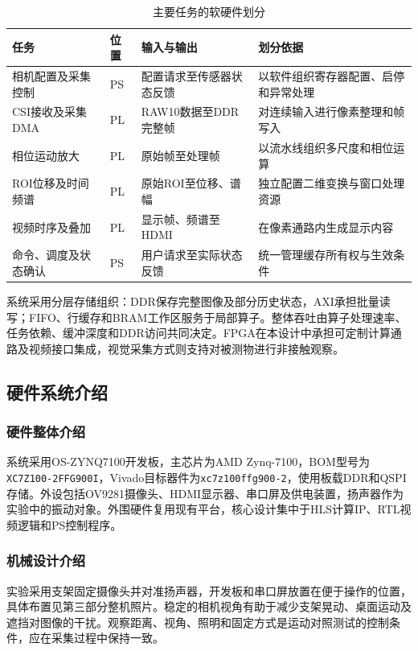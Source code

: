 \documentclass[UTF8,a4paper,zihao=-4,fontset=none]{ctexart}
\renewcommand{\small}{\fontsize{10.5pt}{13pt}\selectfont}
\numberwithin{figure}{section}
\numberwithin{table}{section}
\begin{document}
\begin{table}[htbp]
\centering\small
\caption{主要任务的软硬件划分}\label{tab:partition}
\begin{tabularx}{\linewidth}{@{}p{2.6cm}p{1.3cm}X X@{}}
\toprule
任务 & 位置 & 输入与输出 & 划分依据 \\
\midrule
相机配置及采集控制 & PS & 配置请求至传感器状态反馈 & 以软件组织寄存器配置、启停和异常处理 \\
CSI接收及采集DMA & PL & RAW10数据至DDR完整帧 & 对连续输入进行像素整理和帧写入 \\
相位运动放大 & PL & 原始帧至处理帧 & 以流水线组织多尺度和相位运算 \\
ROI位移及时间频谱 & PL & 原始ROI至位移、谱幅 & 独立配置二维变换与窗口处理资源 \\
视频时序及叠加 & PL & 显示帧、频谱至HDMI & 在像素通路内生成显示内容 \\
命令、调度及状态确认 & PS & 用户请求至实际状态反馈 & 统一管理缓存所有权与生效条件 \\
\bottomrule
\end{tabularx}
\end{table}

系统采用分层存储组织：DDR保存完整图像及部分历史状态，AXI承担批量读写；FIFO、行缓存和BRAM工作区服务于局部算子。整体吞吐由算子处理速率、任务依赖、缓冲深度和DDR访问共同决定。FPGA在本设计中承担可定制计算通路及视频接口集成，视觉采集方式则支持对被测物进行非接触观察。

\subsection{硬件系统介绍}
\subsubsection{硬件整体介绍}
系统采用OS-ZYNQ7100开发板，主芯片为AMD Zynq-7100，BOM型号为\texttt{XC7Z100-2FFG900I}，Vivado目标器件为\texttt{xc7z100ffg900-2}，使用板载DDR和QSPI存储。外设包括OV9281摄像头、HDMI显示器、串口屏及供电装置，扬声器作为实验中的振动对象。外围硬件复用现有平台，核心设计集中于HLS计算IP、RTL视频逻辑和PS控制程序。

\subsubsection{机械设计介绍}
实验采用支架固定摄像头并对准扬声器，开发板和串口屏放置在便于操作的位置，具体布置见第三部分整机照片。稳定的相机视角有助于减少支架晃动、桌面运动及遮挡对图像的干扰。观察距离、视角、照明和固定方式是运动对照测试的控制条件，应在采集过程中保持一致。
\end{document}
